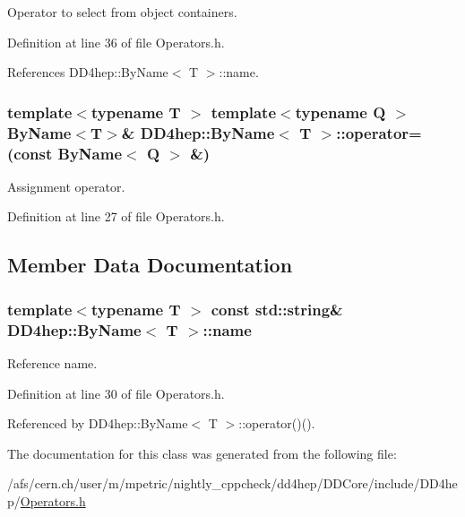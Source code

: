 Operator to select from object containers. 

Definition at line 36 of file Operators.h.

References DD4hep::ByName$<$ T $>$::name.\hypertarget{class_d_d4hep_1_1_by_name_a558d846021ba7038c1446b2f11677c06}{
\subsubsection[{operator=}]{\setlength{\rightskip}{0pt plus 5cm}template$<$typename T $>$ template$<$typename Q $>$ {\bf ByName}$<${\bf T}$>$\& {\bf DD4hep::ByName}$<$ {\bf T} $>$::operator= (const {\bf ByName}$<$ Q $>$ \&)}}
\label{class_d_d4hep_1_1_by_name_a558d846021ba7038c1446b2f11677c06}


Assignment operator. 

Definition at line 27 of file Operators.h.

\subsection{Member Data Documentation}
\hypertarget{class_d_d4hep_1_1_by_name_a06f4c668c9195f670ee1ace07191efa1}{
\subsubsection[{name}]{\setlength{\rightskip}{0pt plus 5cm}template$<$typename T $>$ const std::string\& {\bf DD4hep::ByName}$<$ {\bf T} $>$::{\bf name}}}
\label{class_d_d4hep_1_1_by_name_a06f4c668c9195f670ee1ace07191efa1}


Reference name. 

Definition at line 30 of file Operators.h.

Referenced by DD4hep::ByName$<$ T $>$::operator()().

The documentation for this class was generated from the following file:\begin{DoxyCompactItemize}
\item 
/afs/cern.ch/user/m/mpetric/nightly\_\-cppcheck/dd4hep/DDCore/include/DD4hep/\hyperlink{_operators_8h}{Operators.h}\end{DoxyCompactItemize}
